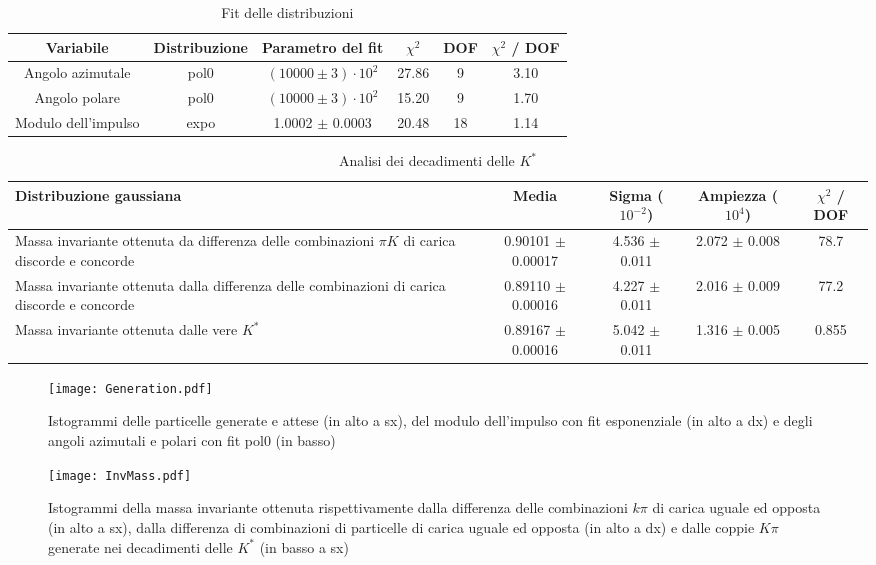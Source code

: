 \documentclass[a4paper,10pt,twocolumn]{article}
\begin{document}
\begin{table*}
    \caption{Fit delle distribuzioni}
    \label{tab:fit}
    \centering
    \begin{tabular}{cccccc}
        \toprule
        Variabile           & Distribuzione & Parametro del fit          & $\chi^2$ & DOF & $\chi^2$ / DOF \\
        \midrule
        Angolo azimutale    & pol0          & $(10000 \pm 3) \cdot 10^2$ & 27.86    & 9   & 3.10           \\
        Angolo polare       & pol0          & $(10000 \pm 3) \cdot 10^2$ & 15.20    & 9   & 1.70           \\
        Modulo dell'impulso & expo          & 1.0002 $\pm$ 0.0003        & 20.48    & 18  & 1.14           \\
        \bottomrule
    \end{tabular}
\end{table*}

\begin{table*}
    \caption{Analisi dei decadimenti delle $K^*$}
    \label{tab:fit}
    \centering
    \begin{tabular}{p{5cm}cccc}
        \toprule
        Distribuzione gaussiana                                                                          & Media                 & Sigma ($10^{-2}$) & Ampiezza ($10^4$) & $\chi^2$ / DOF \\
        \midrule
        Massa invariante ottenuta da differenza delle combinazioni $\pi K$ di carica discorde e concorde & 0.90101 $\pm$ 0.00017 & 4.536 $\pm$ 0.011 & 2.072 $\pm$ 0.008 & 78.7           \\
        \midrule
        Massa invariante ottenuta dalla differenza delle combinazioni di carica discorde e concorde      & 0.89110 $\pm$ 0.00016 & 4.227 $\pm$ 0.011 & 2.016 $\pm$ 0.009 & 77.2           \\
        \midrule
        Massa invariante ottenuta dalle vere $K^*$                                                       & 0.89167 $\pm$ 0.00016 & 5.042 $\pm$ 0.011 & 1.316 $\pm$ 0.005 & 0.855          \\
        \bottomrule
    \end{tabular}
\end{table*}

\begin{figure*}
    \texttt{[image: Generation.pdf]}
    \caption{Istogrammi delle particelle generate e attese (in alto a sx), del modulo dell'impulso con fit esponenziale (in alto a dx) e degli angoli azimutali e polari con fit pol0 (in basso)}
    \label{fig:Generation}
\end{figure*}

\begin{figure*}
    \texttt{[image: InvMass.pdf]}
    \caption{Istogrammi della massa invariante ottenuta rispettivamente dalla differenza delle combinazioni $k\pi$ di carica uguale ed opposta (in alto a sx), dalla differenza di combinazioni di particelle di carica uguale ed opposta (in alto a dx) e dalle coppie $K\pi$ generate nei decadimenti delle $K^*$ (in basso a sx)}
    \label{fig:InvMass}
\end{figure*}
\end{document}
